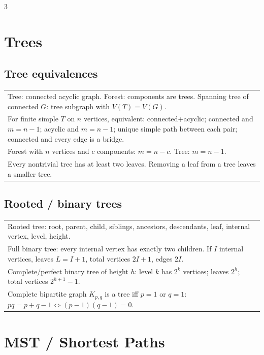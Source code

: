 \documentclass[10pt]{article}
\begin{document}
\begin{multicols*}{3}
\section*{Trees}
\subsection*{Tree equivalences}
\begin{tabular}{@{}p{}@{}}
Tree: connected acyclic graph. Forest: components are trees. Spanning tree of connected \(G\): tree subgraph with \(V(T)=V(G)\).\\
For finite simple \(T\) on \(n\) vertices, equivalent: connected+acyclic; connected and \(m=n-1\); acyclic and \(m=n-1\); unique simple path between each pair; connected and every edge is a bridge.\\
Forest with \(n\) vertices and \(c\) components: \(m=n-c\). Tree: \(m=n-1\).\\
Every nontrivial tree has at least two leaves. Removing a leaf from a tree leaves a smaller tree.\\
\end{tabular}

\subsection*{Rooted / binary trees}
\begin{tabular}{@{}p{}@{}}
Rooted tree: root, parent, child, siblings, ancestors, descendants, leaf, internal vertex, level, height.\\
Full binary tree: every internal vertex has exactly two children. If \(I\) internal vertices, leaves \(L=I+1\), total vertices \(2I+1\), edges \(2I\).\\
Complete/perfect binary tree of height \(h\): level \(k\) has \(2^k\) vertices; leaves \(2^h\); total vertices \(2^{h+1}-1\).\\
Complete bipartite graph \(K_{p,q}\) is a tree iff \(p=1\) or \(q=1\): \(pq=p+q-1\iff(p-1)(q-1)=0\).\\
\end{tabular}

\section*{MST / Shortest Paths}

\end{multicols*}
\end{document}
